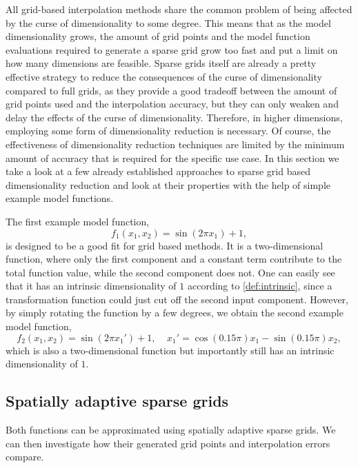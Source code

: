 \documentclass[
  a4paper,  %
  twoside,  %
  bibliography=totoc,
  headsepline,
  cleardoublepage=empty,
  parskip=half,
  draft=false
]{scrbook}
\begin{document}
All grid-based interpolation methods share the common problem of being affected by the curse of dimensionality \cite{Bellman1961} to some degree.
This means that as the model dimensionality grows, the amount of grid points and the model function evaluations required to generate a sparse grid grow too fast and put a limit on how many dimensions are feasible.
Sparse grids itself are already a pretty effective strategy to reduce the consequences of the curse of dimensionality compared to full grids, as they provide a good tradeoff between the amount of grid points used and the interpolation accuracy, but they can only weaken and delay the effects of the curse of dimensionality.
Therefore, in higher dimensions, employing some form of dimensionality reduction is necessary.
Of course, the effectiveness of dimensionality reduction techniques are limited by the minimum amount of accuracy that is required for the specific use case.
In this section we take a look at a few already established approaches to sparse grid based dimensionality reduction and look at their properties with the help of simple example model functions.

The first example model function,
\begin{equation}
f_1(x_1, x_2)=\sin(2 \pi x_1) + 1,
\end{equation}
 is designed to be a good fit for grid based methods.
It is a two-dimensional function, where only the first component and a constant term contribute to the total function value, while the second component does not.
One can easily see that it has an intrinsic dimensionality of $1$ according to \cref{def:intrinsic}, since a transformation function could just cut off the second input component.
However, by simply rotating the function by a few degrees, we obtain the second example model function,
\begin{equation}
f_2(x_1,x_2)=\sin(2 \pi x_1') + 1, ~~~~~ x_1'=\cos(0.15 \pi) x_1 -\sin(0.15 \pi) x_2,
\end{equation}
which is also a two-dimensional function but importantly still has an intrinsic dimensionality of $1$.

\subsection{Spatially adaptive sparse grids}

Both functions can be approximated using spatially adaptive sparse grids.
We can then investigate how their generated grid points and interpolation errors compare.
\end{document}
